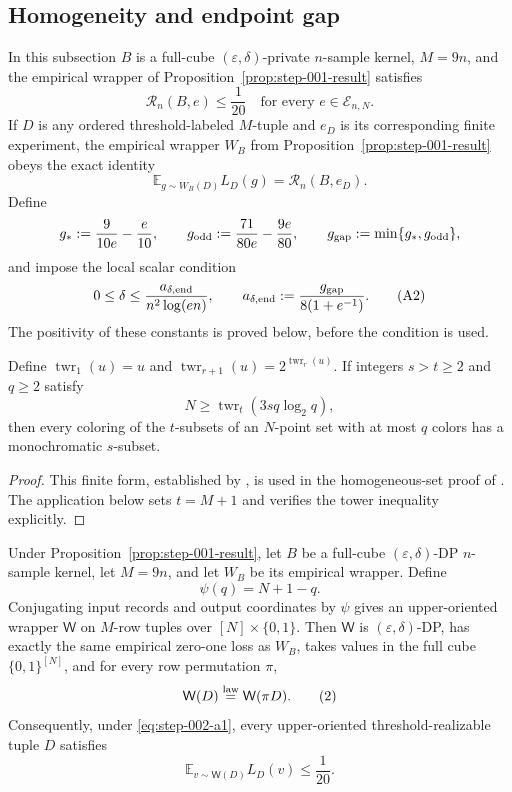 \subsection{Homogeneity and endpoint gap}
\label{app:step-002}

In this subsection $B$ is a full-cube
$(\varepsilon,\delta)$-private $n$-sample kernel, $M=9n$, and the
empirical wrapper of Proposition~\ref{prop:step-001-result} satisfies
\[
\mathcal R_n(B,e)\leq\frac1{20}
\quad\text{for every }e\in\mathcal E_{n,N}.
\tag{A1}\label{eq:step-002-a1}
\]
If $D$ is any ordered threshold-labeled $M$-tuple and $e_D$ is its
corresponding finite experiment, the empirical wrapper $W_B$ from
Proposition~\ref{prop:step-001-result} obeys the exact identity
\[
\mathbb E_{g\sim W_B(D)}L_D(g)=\mathcal R_n(B,e_D).
\tag{C1}\label{eq:step-002-c1}
\]
Define
\[
g_*:=\frac9{10e}-\frac e{10},\qquad
g_{\rm odd}:=\frac{71}{80e}-\frac{9e}{80},\qquad
g_{\rm gap}:=\min\{g_*,g_{\rm odd}\},
\]
and impose the local scalar condition
\[
0\leq\delta\leq
\frac{a_{\delta,{\rm end}}}{n^2\log(en)},
\qquad
a_{\delta,{\rm end}}
:=\frac{g_{\rm gap}}{8(1+e^{-1})}.
\tag{A2}\label{eq:step-002-a2}
\]
The positivity of these constants is proved below, before the condition
is used.

\begin{theorem}
\label{thm:finite-ramsey}
Define $\operatorname{twr}_1(u)=u$ and
$\operatorname{twr}_{r+1}(u)=2^{\operatorname{twr}_r(u)}$.  If integers
$s>t\geq2$ and $q\geq2$ satisfy
\[
N\geq\operatorname{twr}_t(3sq\log_2q),
\tag{C2}\label{eq:step-002-c2}
\]
then every coloring of the $t$-subsets of an $N$-point set with at most
$q$ colors has a monochromatic $s$-subset.
\end{theorem}
\begin{proof}
This finite form, established by \citet{erdosRado1952}, is used in
the homogeneous-set proof of \citet{alonEtAl2018private}.  The
application below sets $t=M+1$ and verifies the tower inequality
explicitly.
\end{proof}



\begin{lemma}
\label{lem:step-002-oriented-wrapper}

Under Proposition~\ref{prop:step-001-result}, let \(B\) be a full-cube \((\varepsilon,\delta)\)-DP \(n\)-sample kernel, let \(M=9n\), and let \(W_B\) be its empirical wrapper. Define
\[
\psi(q)=N+1-q.
\tag{1}\label{eq:step-002-1}
\]
Conjugating input records and output coordinates by \(\psi\) gives an upper-oriented wrapper \(\mathsf W\) on \(M\)-row tuples over \([N] \times \{0,1\}\). Then \(\mathsf W\) is \((\varepsilon,\delta)\)-DP, has exactly the same empirical zero-one loss as \(W_B\), takes values in the full cube \(\{0,1\}^{[N]}\), and for every row permutation \(\pi\),
\[
\mathsf W(D)\stackrel{\rm law}=\mathsf W(\pi D).
\tag{2}\label{eq:step-002-2}
\]
Consequently, under \eqref{eq:step-002-a1}, every upper-oriented threshold-realizable tuple \(D\) satisfies
\[
\mathbb E_{v\sim\mathsf W(D)}L_D(v)\le\frac1{20}.
\tag{3}\label{eq:step-002-3}
\]

\end{lemma}

